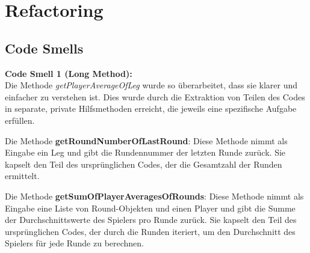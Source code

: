 \chapter{Refactoring}
\section{Code Smells}
\textbf{Code Smell 1 (Long Method):}\\


Die Methode \textit{getPlayerAverageOfLeg} wurde so überarbeitet, dass sie klarer und einfacher zu verstehen ist. Dies wurde durch die Extraktion von Teilen des Codes in separate, private Hilfsmethoden erreicht, die jeweils eine spezifische Aufgabe erfüllen.

Die Methode \textbf{getRoundNumberOfLastRound}: Diese Methode nimmt als Eingabe ein Leg und gibt die Rundennummer der letzten Runde zurück. Sie kapselt den Teil des ursprünglichen Codes, der die Gesamtzahl der Runden ermittelt.

Die Methode \textbf{getSumOfPlayerAveragesOfRounds}: Diese Methode nimmt als Eingabe eine Liste von Round-Objekten und einen Player und gibt die Summe der Durchschnittswerte des Spielers pro Runde zurück. Sie kapselt den Teil des ursprünglichen Codes, der durch die Runden iteriert, um den Durchschnitt des Spielers für jede Runde zu berechnen.

